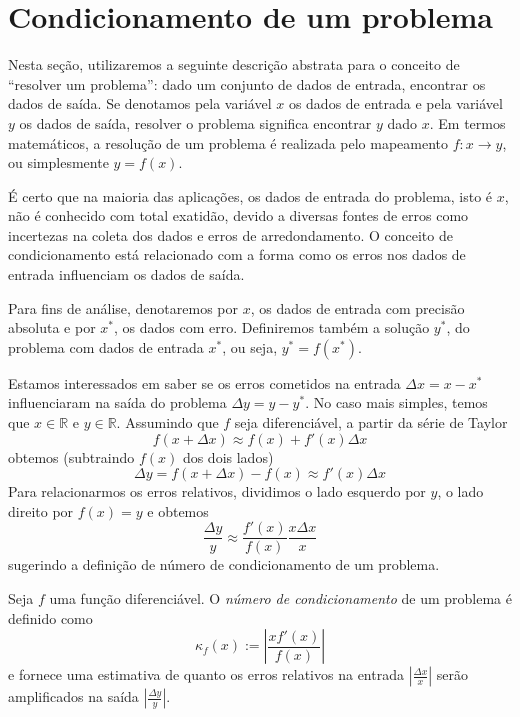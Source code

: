 \section{Condicionamento de um problema}
Nesta seção, utilizaremos a seguinte descrição abstrata para o conceito de ``resolver um problema'': dado um conjunto de dados de entrada, encontrar os dados de saída. Se denotamos pela variável $x$ os dados de entrada e pela variável $y$ os dados de saída, resolver o problema significa encontrar $y$ dado $x$. Em termos matemáticos, a resolução de um problema é realizada pelo mapeamento $f:x \rightarrow y$, ou simplesmente $y = f(x)$.

É certo que na maioria das aplicações, os dados de entrada do problema, isto é $x$, não é conhecido com total exatidão, devido a diversas fontes de erros como incertezas na coleta dos dados e erros de arredondamento. O conceito de condicionamento está relacionado com a forma como os erros nos dados de entrada influenciam os dados de saída.

Para fins de análise, denotaremos por $x$, os dados de entrada com precisão absoluta e por $x^*$, os dados com erro. Definiremos também a solução $y^*$, do problema com dados de entrada $x^*$, ou seja, $y^* = f(x^*)$.

Estamos interessados em saber se os erros cometidos na entrada $\Delta x=x-x^* $ influenciaram na saída do problema $\Delta y=y-y^*$. No caso mais simples, temos que $x \in \mathbb{R}$ e $y \in \mathbb{R}$. Assumindo que $f$ seja diferenciável, a partir da série de Taylor
\begin{equation*}
 f(x+\Delta x) \approx f(x) + f'(x) \Delta x
\end{equation*}
obtemos (subtraindo $f(x)$ dos dois lados)
\begin{equation*}
 \Delta y = f(x+\Delta x)-f(x) \approx f'(x) \Delta x
\end{equation*}
Para relacionarmos os erros relativos, dividimos o lado esquerdo por $y$, o lado direito por $f(x)=y$ e obtemos
\begin{equation*}
 \frac{ \Delta y}{y} \approx \frac{f'(x)}{f(x)}  \frac{x \Delta x}{x} 
\end{equation*}
sugerindo a definição de número de condicionamento de um problema.

\begin{defn}
Seja $f$ uma função diferenciável. O \emph{número de condicionamento} de um problema é definido como
\begin{equation*}
  \kappa_f(x) := \left| \frac{ x f'(x)}{f(x)} \right|
\end{equation*}
e fornece uma estimativa de quanto os erros relativos na entrada $\left|\frac{\Delta x}{x}\right|$ serão amplificados na saída $\left|\frac{\Delta y}{y}\right|$.
\end{defn}


